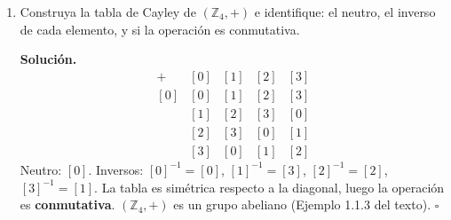 \begin{enumerate}[label=\textbf{1.\arabic*.}]
\textbf{Solución.}
\begin{enumerate}[label=\alph*)]
    \item
    \[
    \begin{array}{c|ccc}
        \diamond & 0 & 1 & 2 \\ \hline
        0        & 0 & 1 & 2 \\
        1        & 1 & 2 & 2 \\
        2        & 2 & 2 & 2
    \end{array}
    \]
    \item Debemos verificar \(a \diamond (b \diamond c) = (a \diamond b) \diamond c\).
    Sean \(a,b,c \in \{0,1,2\}\). Ambos lados calculan
    \(\min\{a + b + c,\, 2\}\), ya que la función \(\min\{\cdot, 2\}\) es monótona y
    \(\min\{\min\{a+b,2\}+c,2\} = \min\{a+b+c,2\}\) (si \(a+b \geq 2\) el resultado
    es \(2\) en cualquier caso; si \(a+b < 2\) entonces \(\min\{a+b,2\}=a+b\)).
    La operación es \textbf{asociativa}.
    \item Identidad: \(a \diamond 0 = \min\{a,2\} = a\) para \(a \leq 2\) \checkmark.
    Neutro es \(0\). ¿Inversos? El elemento \(2\) satisface
    \(2 \diamond b = \min\{2+b,2\} = 2\) para todo \(b\), nunca vuelve a \(0\).
    \textbf{\((A,\diamond)\) es monoide conmutativo, pero no grupo.} \hfill\(\square\)
\end{enumerate}

\item Construya la tabla de Cayley de \((\mathbb{Z}_4, +)\) e identifique:
el neutro, el inverso de cada elemento, y si la operación es conmutativa.

\textbf{Solución.}
\[
\begin{array}{c|cccc}
    +    & [0] & [1] & [2] & [3] \\ \hline
    [0]  & [0] & [1] & [2] & [3] \\
    [1]  & [1] & [2] & [3] & [0] \\
    [2]  & [2] & [3] & [0] & [1] \\
    [3]  & [3] & [0] & [1] & [2]
\end{array}
\]
Neutro: \([0]\).
Inversos: \([0]^{-1}=[0]\), \([1]^{-1}=[3]\), \([2]^{-1}=[2]\), \([3]^{-1}=[1]\).
La tabla es simétrica respecto a la diagonal, luego la operación es \textbf{conmutativa}.
\((\mathbb{Z}_4, +)\) es un grupo abeliano (Ejemplo 1.1.3 del texto). \hfill\(\square\)


\end{enumerate}
